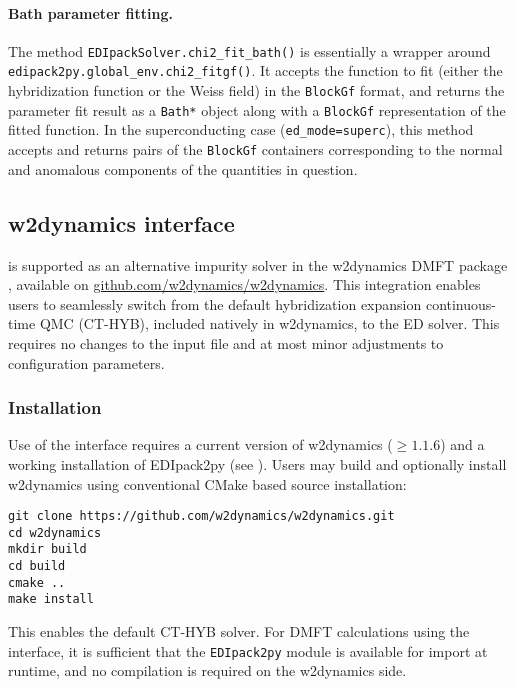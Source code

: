 \documentclass[edipack_sp.tex]{subfiles}
\begin{document}
\paragraph{{\bf Bath parameter fitting}.}
The method {\tt EDIpackSolver.chi2\_fit\_bath()} is essentially a wrapper around
{\tt edipack2py.global\_env.chi2\_fitgf()}. It accepts the function to fit (either
the hybridization function or the Weiss field) in the {\tt BlockGf} format,
and returns the parameter fit result as a {\tt Bath*} object along with a
{\tt BlockGf} representation of the fitted function. In the superconducting
case ({\tt ed\_mode=superc}), this method accepts and returns pairs of
the {\tt BlockGf} containers corresponding to the normal and anomalous 
components of the quantities in question.







\subsection{w2dynamics interface}\label{sSecInteropw2dyN}
\NAME is supported as an alternative impurity solver in the w2dynamics DMFT package \cite{Wallerberger2019CPC}, available on \href{https://github.com/w2dynamics/w2dynamics}{github.com/w2dynamics/w2dynamics}. 
This integration enables users to 
seamlessly switch from the default hybridization expansion continuous-time QMC  (CT-HYB), included natively
in w2dynamics, to the \NAME ED solver. This requires no changes to the input file and at most minor  adjustments to configuration parameters.


\subsubsection{Installation}\label{sSecInteropw2dyNPrereq}
Use of the interface requires a current version of w2dynamics ($\geq 1.1.6$) and a working installation of EDIpack2py (see 
). 
Users may build and optionally install w2dynamics using conventional CMake based source installation: 
\begin{lstlisting}[style=mybash]
git clone https://github.com/w2dynamics/w2dynamics.git
cd w2dynamics
mkdir build
cd build
cmake ..
make install
\end{lstlisting}
This enables the default CT-HYB solver. For DMFT calculations 
using the \NAME interface, it is sufficient that the 
\texttt{EDIpack2py} module is available for import at runtime, and no compilation is required on the w2dynamics side.
\end{document}
